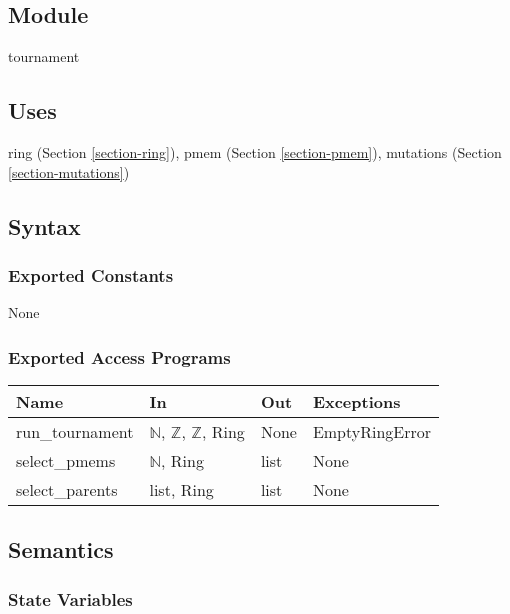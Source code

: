 \documentclass[12pt, titlepage]{article}
\begin{document}
\subsection{Module}

tournament

\subsection{Uses}

ring (Section \ref{section-ring}),
pmem (Section \ref{section-pmem}),
mutations (Section \ref{section-mutations})

\subsection{Syntax}

\subsubsection{Exported Constants}

None

\subsubsection{Exported Access Programs}

\begin{center}
	\begin{tabular}{p{3.5cm} p{4cm} p{4cm} p{2cm}}
		\hline
		\textbf{Name} & \textbf{In} & \textbf{Out} & \textbf{Exceptions} \\
		\hline
		run\_tournament & $\mathbb{N}$, $\mathbb{Z}$, $\mathbb{Z}$, Ring & None 
		& EmptyRingError \\
		select\_pmems & $\mathbb{N}$, Ring & list & None \\
		select\_parents & list, Ring & list & None \\
		\hline
	\end{tabular}
\end{center}

\subsection{Semantics}

\subsubsection{State Variables}
\end{document}
